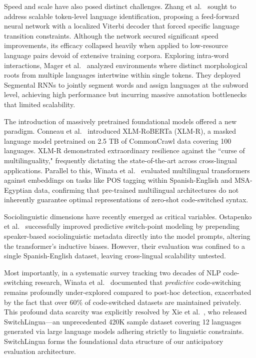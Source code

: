 \documentclass[sigconf,nonacm]{acmart}
\begin{document}
Speed and scale have also posed distinct challenges. Zhang et al.~\cite{zhang2018fast} sought to address scalable token-level language identification, proposing a feed-forward neural network with a localized Viterbi decoder that forced specific language transition constraints. Although the network secured significant speed improvements, its efficacy collapsed heavily when applied to low-resource language pairs devoid of extensive training corpora. Exploring intra-word interactions, Mager et al.~\cite{mager2019subword} analyzed environments where distinct morphological roots from multiple languages intertwine within single tokens. They deployed Segmental RNNs to jointly segment words and assign languages at the subword level, achieving high performance but incurring massive annotation bottlenecks that limited scalability.

The introduction of massively pretrained foundational models offered a new paradigm. Conneau et al.~\cite{conneau2020xlmr} introduced XLM-RoBERTa (XLM-R), a masked language model pretrained on 2.5 TB of CommonCrawl data covering 100 languages. XLM-R demonstrated extraordinary resilience against the ``curse of multilinguality," frequently dictating the state-of-the-art across cross-lingual applications. Parallel to this, Winata et al.~\cite{winata2021multilingual} evaluated multilingual transformers against embeddings on tasks like POS tagging within Spanish-English and MSA-Egyptian data, confirming that pre-trained multilingual architectures do not inherently guarantee optimal representations of zero-shot code-switched syntax.

Sociolinguistic dimensions have recently emerged as critical variables. Ostapenko et al.~\cite{ostapenko2022speaker} successfully improved predictive switch-point modeling by prepending speaker-based sociolinguistic metadata directly into the model prompts, altering the transformer's inductive biases. However, their evaluation was confined to a single Spanish-English dataset, leaving cross-lingual scalability untested. 

Most importantly, in a systematic survey tracking two decades of NLP code-switching research, Winata et al.~\cite{winata2023decades} documented that \textit{predictive} code-switching remains profoundly under-explored compared to post-hoc detection, exacerbated by the fact that over 60\% of code-switched datasets are maintained privately. This profound data scarcity was explicitly resolved by Xie et al.~\cite{xie2025switchlingua}, who released SwitchLingua—an unprecedented 420K sample dataset covering 12 languages generated via large language models adhering strictly to linguistic constraints. SwitchLingua forms the foundational data structure of our anticipatory evaluation architecture.
\end{document}
